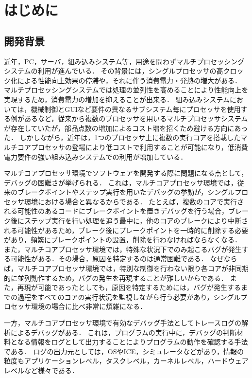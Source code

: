 \chapter{はじめに}

\section{開発背景}
近年，PC，サーバ，組み込みシステム等，用途を問わずマルチプロセッシングシステムの利用が進んでいる．
その背景には，シングルプロセッサの高クロック化による性能向上効果の停滞や，それに伴う消費電力・発熱の増大がある．
マルチプロセッシングシステムでは処理の並列性を高めることにより性能向上を実現するため，消費電力の増加を抑えることが出来る．
組み込みシステムにおいては，機械制御とGUIなど要件の異なるサブシステム毎にプロセッサを使用する例があるなど，従来から複数のプロセッサを用いるマルチプロセッサシステムが存在していたが，部品点数の増加によるコスト増を招くため避ける方向にあった．
しかしながら，近年は，1つのプロセッサ上に複数の実行コアを搭載したマルチコアプロセッサの登場により低コストで利用することが可能になり，低消費電力要件の強い組み込みシステムでの利用が増加している．

マルチコアプロセッサ環境でソフトウェアを開発する際に問題になる点として，デバッグの困難さが挙げられる．
これは，マルチコアプロセッサ環境では，従来のブレークポイントやステップ実行を用いたデバッグの挙動が，シングルプロセッサ環境における場合と異なるからである．
たとえば，複数のコアで実行される可能性のあるコードにブレークポイントを置きデバッグを行う場合，ブレーク後にステップ実行を行い処理を追う最中に，他のコアのブレークにより中断される可能性があるため，ブレーク後にブレークポイントを一時的に削除する必要があり，頻繁にブレークポイントの設置，削除を行わなければならなくなる．
また，マルチコアプロセッサ環境では，特殊な状況下でのみ起こるバグが発生する可能性がある．その場合，原因を特定するのは通常困難である．
なぜならば，マルチコアプロセッサ環境では，特別な制御を行わない限り各コアが非同期的に並列動作するため，バグの発生を再現することが難しいからである．
また，再現が可能であったとしても，原因を特定するためには，バグが発生するまでの過程をすべてのコアの実行状況を監視しながら行う必要があり，シングルプロセッサ環境の場合に比べ非常に煩雑になる．

一方，マルチコアプロセッサ環境で有効なデバッグ手法としてトレースログの解析によるデバッグがある．
これは，プログラムの実行中に，デバッグの判断材料となる情報をログとして出力することによりプログラムの動作を確認する手法である．
ログの出力元としては，OSやICE，シミュレータなどがあり，情報の粒度もアプリケーションレベル，タスクレベル，カーネルレベル，ハードウェアレベルなど様々である．

